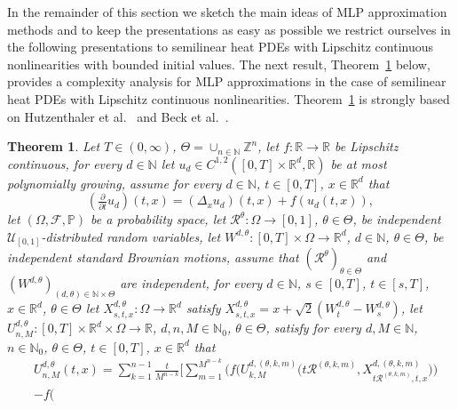 \documentclass[12pt]{article}
\newtheorem{theorem}{Theorem}
\theoremstyle{definition}
\newcommand{\R}{\mathbb{R}}
\newcommand{\Z}{\mathbb{Z}}
\renewcommand{\P}{\mathbb{P}}
\newcommand{\N}{\mathbb{N}}
\begin{document}
In the remainder of this section we sketch the main ideas of MLP approximation methods 
and to keep the presentations as easy as possible we restrict ourselves in the following 
presentations to semilinear heat PDEs with Lipschitz continuous nonlinearities 
with bounded initial values. 
The next result, Theorem~\ref{thm:MLP_analysis} below, provides a complexity analysis 
for MLP approximations in the case of semilinear heat PDEs with Lipschitz continuous nonlinearities. 
Theorem~\ref{thm:MLP_analysis} is strongly based 
on Hutzenthaler et al.~\cite[Theorem~1.1]{Hutzenthaleretal2018arXiv} and 
Beck et al.~\cite[Theorem~1.1]{Becketal2019MLP_nonlip_arXiv}. 
%
%
%
%
\begin{theorem}
\label{thm:MLP_analysis}
Let
$ T \in (0,\infty) $,
$ \Theta = \cup_{ n \in \N } \Z^n $, 
let $ f \colon \R \to \R $ be Lipschitz continuous, 
for every $ d \in \N $ let 
$ u_d \in C^{ 1, 2 }( [0,T] \times \R^d, \R ) $
be at most polynomially growing, 
assume for every 
$ d \in \N $, $ t \in [0,T] $,
$ x \in \R^d $
that 
\begin{equation}
\label{eq:MLP_allen_cahn_pde}
  (\tfrac{\partial}{\partial t}u_d)(t,x) 
  = 
  (\Delta_x u_d)(t,x) 
  + 
  f(u_d(t,x)),
\end{equation} 
let 
  $(\Omega,\mathcal{F},\P)$ 
be a probability space, 
let
  $\mathcal{R}^{\theta}\colon \Omega \to [0,1]$, $\theta\in\Theta$, 
be independent $\mathcal{U}_{[0,1]}$-distributed random variables, 
let 
  $W^{d,\theta}\colon [0,T]\times\Omega\to\R^d$, 
  $d\in\N$,
  $\theta\in\Theta$,
be independent standard Brownian motions, 
assume that 
  $(\mathcal{R}^{\theta})_{\theta\in\Theta}$ 
and
  $(W^{d,\theta})_{(d,\theta)\in\N\times\Theta}$ 
are independent, 
for every 
  $d\in \N$,
  $s\in [0,T]$, 
  $t\in [s,T]$,
  $x\in \R^d$, 
  $\theta\in \Theta$ 
let 
  $X^{d,\theta}_{s,t,x}\colon\Omega\to\R^d$
satisfy 
  $
  X^{d,\theta}_{s,t,x}
  = 
  x + \sqrt{2}(W^{d,\theta}_t - W^{d,\theta}_s)
  $, 
let 
  $U^{d,\theta}_{n,M}\colon [0,T]\times\R^d\times\Omega\to\R$, 
  $d,n,M\in\N_0$,
  $\theta\in\Theta$, 
satisfy for every 
  $d,M\in\N$,
  $ n \in \N_0 $, 
  $\theta\in\Theta$,
  $t\in [0,T]$, 
  $x\in \R^d$ 
that
  \begin{align}\label{eq:mlp}
  & 
  U^{d,\theta}_{n,M}(t,x) 
  = 
  \sum_{k=1}^{n-1} \frac{t}{M^{n-k}} 
  \Bigg[ 
  \sum_{m=1}^{M^{n-k}} 
  \bigg(
  f\Big( 
  U^{d,(\theta,k,m)}_{k,M}\big( t \mathcal{R}^{(\theta,k,m)} , 
  X^{d,(\theta,k,m)}_{ t \mathcal{R}^{(\theta,k,m)},t,x}
  \big)
  \Big)
  \\ 
  & 
  -
  f\Big( 

\end{align}
\end{theorem}
\end{document}

